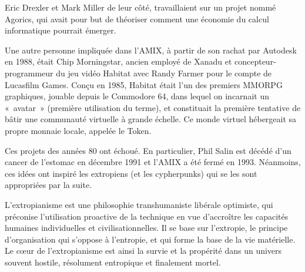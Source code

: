 Eric Drexler et Mark Miller de leur côté, travaillaient sur un projet nommé Agorics, qui avait pour but de théoriser comment une économie du calcul informatique pourrait émerger.

Une autre personne impliquée dans l'AMIX, à partir de son rachat par Autodesk en 1988, était Chip Morningstar, ancien employé de Xanadu et concepteur-programmeur du jeu vidéo Habitat avec Randy Farmer pour le compte de Lucasfilm Games. Conçu en 1985, Habitat était l'un des premiers MMORPG graphiques, jouable depuis le Commodore 64, dans lequel on incarnait un «~avatar~» (première utilisation du terme), et constituait la première tentative de bâtir une communauté virtuelle à grande échelle. Ce monde virtuel hébergeait sa propre monnaie locale, appelée le Token.

Ces projets des années 80 ont échoué. En particulier, Phil Salin est décédé d'un cancer de l'estomac en décembre 1991 et l'AMIX a été fermé en 1993. Néanmoins, ces idées ont inspiré les extropiens (et les cypherpunks) qui se les sont appropriées par la suite.


L'extropianisme est une philosophie transhumaniste libérale optimiste, qui préconise l'utilisation proactive de la technique en vue d'accroître les capacités humaines individuelles et civilisationnelles. Il se base sur l'extropie, le principe d'organisation qui s'oppose à l'entropie, et qui forme la base de la vie matérielle. Le cœur de l'extropianisme est ainsi la survie et la propérité dans un univers souvent hostile, résolument entropique et finalement mortel.

